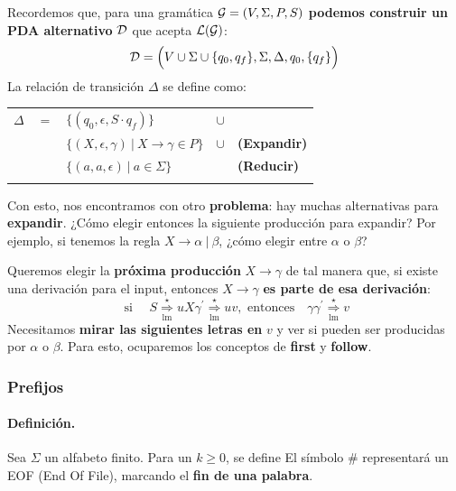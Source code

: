 Recordemos que, para una gramática $\mathcal{G}=(V,\Sigma, P, S)$ \textbf{podemos construir un PDA alternativo} $\mathcal{D}$ que acepta $\mathcal{L}(\mathcal{G})$:
$$
    \mathcal{D}=\Big( V \cup \Sigma \cup \{q_0,q_f\}, \Sigma, \Delta, q_0, \{q_f\} \Big)
$$
La relación de transición $\Delta$ se define como:
\begin{table}[H]
    \centering
    \begin{tabular}{lllll}
        $\Delta$ & $=$ & $\{ (q_0, \epsilon, S \cdot q_f) \}$               & $\cup$ &                     \\
                 &     & $\{ (X,\epsilon,\gamma)\ | \ X\to \gamma \in P \}$ & $\cup$ & \textbf{(Expandir)} \\
                 &     & $\{ (a,a,\epsilon) \ | \ a \in \Sigma \}$          &        & \textbf{(Reducir)}  \\
                 &     &                                                    &        &
    \end{tabular}
\end{table}
Con esto, nos encontramos con otro \textbf{problema}: hay muchas alternativas para \textbf{expandir}. ¿Cómo elegir entonces la siguiente producción para expandir? Por ejemplo, si tenemos la regla $X \to \alpha \ | \ \beta$, ¿cómo elegir entre $\alpha$ o $\beta$? \medbreak

Queremos elegir la \textbf{próxima producción} $X\to\gamma$ de tal manera que, si existe una derivación para el input, entonces $X\to\gamma$ \textbf{es parte de esa derivación}:
$$
    \text { si }\quad  S \underset{\mathrm{lm}}{\stackrel{\star}{\Rightarrow}} u X \gamma^{\prime} \underset{\mathrm{lm}}{\stackrel{\star}{\Rightarrow}} u v, \text { entonces}\quad \gamma \gamma^{\prime} \underset{\mathrm{lm}}{\stackrel{\star}{\Rightarrow}} v
$$
Necesitamos \textbf{mirar las siguientes letras en} $v$ y ver si pueden ser producidas por $\alpha$ o $\beta$. Para esto, ocuparemos los conceptos de \textbf{first} y \textbf{follow}.

\subsubsection{Prefijos}\label{prefijos}
\paragraph{Definición.} Sea $\Sigma$ un alfabeto finito. Para un $k \ge 0$, se define
El símbolo $\#$ representará un EOF (End Of File), marcando el \textbf{fin de una palabra}.

